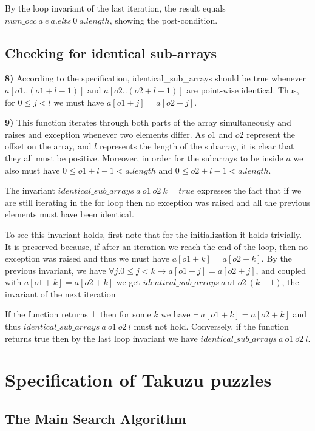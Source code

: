 \documentclass[]{StandardTemplate}
\begin{document}
By the loop invariant of the last iteration, the result equals $num\_occ~a~e~a.elts~0~a.length$, showing the post-condition.

\subsection{Checking for identical sub-arrays}
\label{subsec:identical}


\textbf{8)} According to the specification, identical\_sub\_arrays should be true whenever $ a[o1..(o1+l-1)]$ and $a[o2..(o2+l-1)] $ are point-wise identical. Thus, for $ 0 \leq j < l $ we must have $ a[o1 + j] = a[o2 + j] $.

\textbf{9)} This function iterates through both parts of the array simultaneously and raises and exception whenever two elements differ. As $ o1 $ and $ o2 $ represent the offset on the array, and $ l $ represents the length of the subarray, it is clear that they all must be positive. Moreover, in order for the subarrays to be inside $ a $ we also must have $ 0 \leq o1+l-1 < a.length $ and $ 0 \leq o2+l-1 < a.length $.

The invariant $ identical\_sub\_arrays~a~o1~o2~k = true $ expresses the fact that if we are still iterating in the for loop then no exception was raised and all the previous elements must have been identical.

To see this invariant holds, first note that for the initialization it holds trivially. It is preserved because, if after an iteration we reach the end of the loop, then no exception was raised and thus we must have $ a[o1+k] = a[o2+k] $. By the previous invariant, we have $ \forall j. 0 \leq j < k \to  a[o1 + j] = a[o2 + j]$, and coupled with $ a[o1+k] = a[o2+k] $ we get $identical\_sub\_arrays~a~o1~o2~(k+1)$, the invariant of the next iteration

If the function returns $ \bot $ then for some $ k $ we have $  \neg~a[o1+k] = a[o2+k] $ and thus $identical\_sub\_arrays~a~o1~o2~l$ must not hold. Conversely, if the function returns true then by the last loop invariant we have $identical\_sub\_arrays~a~o1~o2~l $.

\section{Specification of Takuzu puzzles}
\label{sec:takuzu}

\subsection{The Main Search Algorithm}
\label{subsec:main}
\end{document}
